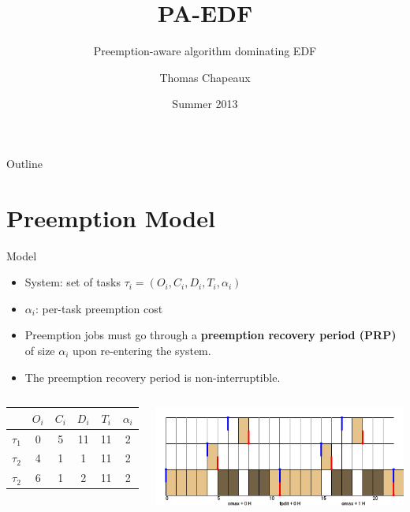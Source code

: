 \documentclass{beamer}
\title {PA-EDF}
\subtitle {Preemption-aware algorithm dominating EDF}
\author{Thomas Chapeaux \inst{1}}
\institute[shortinst]{\inst{1} Université Libre de Bruxelles}
\date{Summer 2013}
\begin{document}
\maketitle{}

\begin{frame}{Outline}
    \tableofcontents
\end{frame}

\section{Preemption Model}

\begin{frame}{Model}
    \begin{itemize}
        \item System: set of tasks $\tau_i = (O_i, C_i, D_i, T_i, \alpha_i)$
        \item $\alpha_i$: per-task preemption cost
        \item Preemption jobs must go through a \textbf{preemption recovery period (PRP)} of size $\alpha_i$ upon re-entering the system.
        \item The preemption recovery period is non-interruptible.
    \end{itemize}
    \begin{columns}[c]
        \begin{center}
            \begin{tabular}{|r|c|c|c|c|c|}
                \hline
                            & $O_i$ & $C_i$ & $D_i$ & $T_i$ & $\alpha_i$ \\ \hline
                $\tau_1$    & 0     & 5     & 11    & 11    & 2     \\ \hline
                $\tau_2$    & 4     & 1     & 1     & 11    & 2     \\ \hline
                $\tau_2$    & 6     & 1     & 2     & 11    & 2     \\ \hline
            \end{tabular}
        \end{center}
        \includegraphics[width=1.1\textwidth]{figs/atomicpreemption_example.png}
    \end{columns}
\end{frame}
\end{document}
